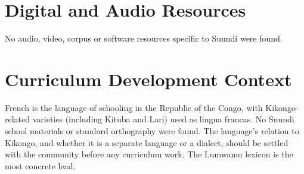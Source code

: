 \documentclass[12pt]{article}
\begin{document}
\section{Digital and Audio Resources}
No audio, video, corpus or software resources specific to Suundi were found.

\section{Curriculum Development Context}
French is the language of schooling in the Republic of the Congo, with Kikongo-related varieties (including Kituba and Lari) used as lingua francas. No Suundi school materials or standard orthography were found. The language's relation to Kikongo, and whether it is a separate language or a dialect, should be settled with the community before any curriculum work. The Lumwamu lexicon is the most concrete lead.
\end{document}
